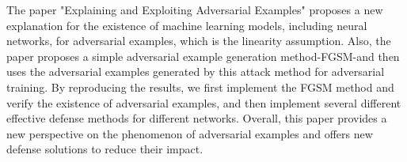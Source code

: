 
The paper "Explaining and Exploiting Adversarial Examples" proposes a new explanation for the existence of machine learning models, including neural networks, for adversarial examples, which is the linearity assumption. Also, the paper proposes a simple adversarial example generation method-FGSM-and then uses the adversarial examples generated by this attack method for adversarial training. By reproducing the results, we first implement the FGSM method and verify the existence of adversarial examples, and then implement several different effective defense methods for different networks. Overall, this paper provides a new perspective on the phenomenon of adversarial examples and offers new defense solutions to reduce their impact.\\

